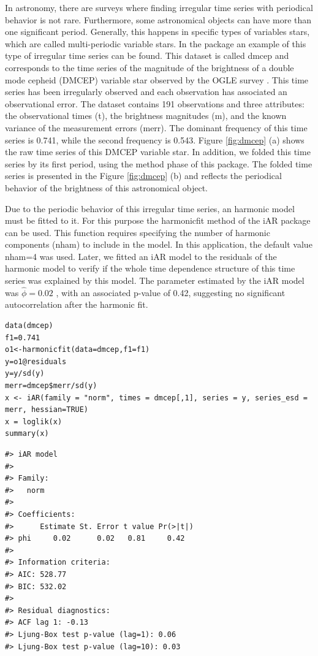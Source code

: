 In astronomy, there are surveys where finding irregular time series with periodical behavior is not rare. Furthermore, some astronomical objects can have more than one significant period. Generally, this happens in specific types of variables stars, which are called multi-periodic variable stars. In the  package an example of this type of irregular time series can be found. This dataset is called dmcep and corresponds to the time series of the magnitude of the brightness of a double mode cepheid (DMCEP) variable star observed by the OGLE survey \citep{OGLE}. This time series has been irregularly observed and each observation has associated an observational error. The dataset contains 191 observations and three attributes: the observational times (t), the brightness magnitudes (m), and the known variance of the measurement errors (merr). The dominant frequency of this time series is 0.741, while the second frequency is 0.543. Figure \ref{fig:dmcep} (a) shows the raw time series of this DMCEP variable star. In addition, we folded this time series by its first period, using the method phase of this package. The folded time series is presented in the Figure \ref{fig:dmcep} (b) and reflects the periodical behavior of the brightness of this astronomical object.

Due to the periodic behavior of this irregular time series, an harmonic model must be fitted to it. For this purpose the harmonicfit method of the iAR package can be used. This function requires specifying the number of harmonic components (nham) to include in the model. In this application, the default value nham=4 was used. Later, we fitted an iAR model to the residuals of the harmonic model to verify if the whole time dependence structure of this time series was explained by this model. The parameter estimated by the iAR model was \(\hat{\phi} = 0.02\) , with an associated p-value of 0.42, suggesting no significant autocorrelation after the harmonic fit.

\begin{verbatim}
data(dmcep)
f1=0.741
o1<-harmonicfit(data=dmcep,f1=f1)
y=o1@residuals
y=y/sd(y)
merr=dmcep$merr/sd(y)
x <- iAR(family = "norm", times = dmcep[,1], series = y, series_esd = merr, hessian=TRUE)
x = loglik(x)
summary(x)
\end{verbatim}

\begin{verbatim}
#> iAR model
#> 
#> Family:
#>   norm 
#> 
#> Coefficients:
#>      Estimate St. Error t value Pr(>|t|)
#> phi     0.02      0.02   0.81     0.42
#> 
#> Information criteria:
#> AIC: 528.77 
#> BIC: 532.02 
#> 
#> Residual diagnostics:
#> ACF lag 1: -0.13 
#> Ljung-Box test p-value (lag=1): 0.06 
#> Ljung-Box test p-value (lag=10): 0.03
\end{verbatim}


